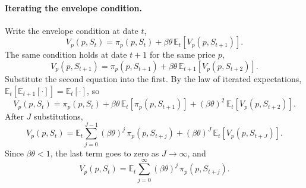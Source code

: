 \documentclass[11pt]{article}
\begin{document}
\paragraph{Iterating the envelope condition.} Write the envelope condition at date $t$,
\begin{equation*}
V_p(p, S_t) = \pi_p(p, S_t) + \beta\theta\, \mathbb{E}_t \left[ V_p(p, S_{t+1}) \right] .
\end{equation*}
The same condition holds at date $t+1$ for the same price $p$,
\begin{equation*}
V_p(p, S_{t+1}) = \pi_p(p, S_{t+1}) + \beta\theta\, \mathbb{E}_{t+1} \left[ V_p(p, S_{t+2}) \right] .
\end{equation*}
Substitute the second equation into the first. By the law of iterated expectations, $\mathbb{E}_t [ \mathbb{E}_{t+1} [ \cdot ] ] = \mathbb{E}_t [ \cdot ]$, so
\begin{equation*}
V_p(p, S_t) = \pi_p(p, S_t) + \beta\theta\, \mathbb{E}_t \left[ \pi_p(p, S_{t+1}) \right] + (\beta\theta)^2\, \mathbb{E}_t \left[ V_p(p, S_{t+2}) \right] .
\end{equation*}
After $J$ substitutions,
\begin{equation*}
V_p(p, S_t) = \mathbb{E}_t \sum_{j=0}^{J-1} (\beta\theta)^{j}\, \pi_p(p, S_{t+j}) + (\beta\theta)^{J}\, \mathbb{E}_t \left[ V_p(p, S_{t+J}) \right] .
\end{equation*}
Since $\beta\theta < 1$, the last term goes to zero as $J \to \infty$, and
\begin{equation*}
V_p(p, S_t) = \mathbb{E}_t \sum_{j=0}^{\infty} (\beta\theta)^{j}\, \pi_p(p, S_{t+j}) .
\end{equation*}
\end{document}
